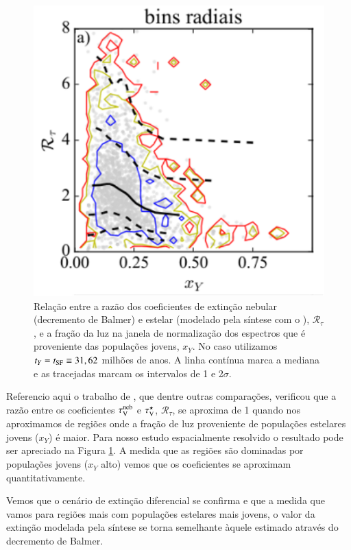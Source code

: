\begin{figure}
	\centering
	\includegraphics{figuras/RtauVxY.pdf}
	\caption[$\mathcal{R}_\tau \times x_Y$]
	{Relação entre a razão dos coeficientes de extinção nebular (decremento de Balmer) e estelar (modelado pela síntese com o \starlight), $\mathcal{R}_\tau$, e a fração da luz na janela de normalização dos espectros que é proveniente das populações jovens, $x_Y$. No caso utilizamos $t_Y = t_{\rm SF} \equiv 31,62$ milhões de anos. A linha contínua marca a mediana e as tracejadas marcam os intervalos de 1 e 2$\sigma$. }
	\label{fig:RtauVxY}
\end{figure}

Referencio aqui o trabalho de \citet{Mari2016}, que dentre outras comparações, verificou que a razão entre os coeficientes $\tau_{\mathrm{V}}^{\mathrm{neb}}$ e $\tau_{\mathrm{V}}^\star$, $\mathcal{R}_\tau$, se aproxima de 1 quando nos aproximamos de regiões onde a fração de luz proveniente de populações estelares jovens ($x_Y$) é maior. Para nosso estudo espacialmente resolvido o resultado pode ser apreciado na Figura \ref{fig:RtauVxY}. A medida que as regiões são dominadas por populações jovens ($x_Y$ alto) vemos que os coeficientes se aproximam quantitativamente.

Vemos que o cenário de extinção diferencial se confirma e que a medida que vamos para regiões mais com populações estelares mais jovens, o valor da extinção modelada pela síntese se torna semelhante àquele estimado através do decremento de Balmer.

